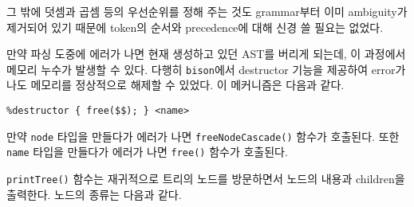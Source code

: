 \documentclass[a4paper, 10pt]{oblivoir}
\begin{document}
그 밖에 덧셈과 곱셈 등의 우선순위를 정해 주는 것도 grammar부터 이미 ambiguity가 제거되어 있기 때문에 token의 순서와 precedence에 대해 신경 쓸 필요는 없었다.

만약 파싱 도중에 에러가 나면 현재 생성하고 있던 AST를 버리게 되는데, 이 과정에서 메모리 누수가 발생할 수 있다. 다행히 \texttt{bison}에서 destructor 기능을 제공하여 error가 나도 메모리를 정상적으로 해제할 수 있었다. 이 메커니즘은 다음과 같다.

\begin{lstlisting}[frame=single]
%destructor { freeNodeCascade($$); } <node>
%destructor { free($$); } <name>
\end{lstlisting}

만약 \texttt{node} 타입을 만들다가 에러가 나면 \texttt{freeNodeCascade()} 함수가 호출된다. 또한 \texttt{name} 타입을 만들다가 에러가 나면 \texttt{free()} 함수가 호출된다.

\texttt{printTree()} 함수는 재귀적으로 트리의 노드를 방문하면서 노드의 내용과 children을 출력한다. 노드의 종류는 다음과 같다.
\end{document}
